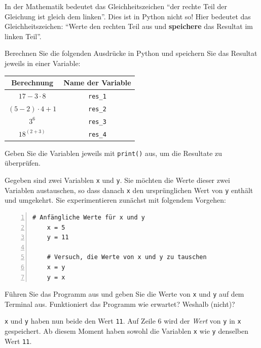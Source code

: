 \begin{myattention}
	In der Mathematik bedeutet das Gleichheitszeichen \enquote{der rechte Teil der Gleichung ist gleich dem linken}. Dies ist in Python nicht so! Hier bedeutet das Gleichheitszeichen: \enquote{Werte den rechten Teil aus und \textbf{speichere} das Resultat im linken Teil}.
\end{myattention}

\begin{myexercise}\label{ex:arithm-ausdruecke}
	Berechnen Sie die folgenden Ausdrücke in Python und speichern Sie das Resultat jeweils in einer Variable:
	\begin{table}[H]
		\centering
		\begin{tabular}{c|c}
			Berechnung          & Name der Variable \\\midrule\midrule
			$17 - 3 \cdot 8$    & \lstinline|res_1| \\\midrule
			$(5-2) \cdot 4 + 1$ & \lstinline|res_2| \\\midrule
			$3^6$               & \lstinline|res_3| \\\midrule
			$18^{(2+3)}$        & \lstinline|res_4|
		\end{tabular}
	\end{table}
	Geben Sie die Variablen jeweils mit \lstinline|print()| aus, um die Resultate zu überprüfen.
	\begin{myanswer}
		
	\end{myanswer}
\end{myexercise}

\begin{myexercise}\label{ex:austausch}
	Gegeben sind zwei Variablen \lstinline|x| und \lstinline|y|. Sie möchten die Werte dieser zwei Variablen austauschen, so dass danach \lstinline|x| den ursprünglichen Wert von \lstinline|y| enthält und umgekehrt. Sie experimentieren zunächst mit folgendem Vorgehen:
	\begin{lstlisting}[numbers=left]
	# Anfängliche Werte für x und y
	x = 5 
	y = 11

	# Versuch, die Werte von x und y zu tauschen
	x = y
	y = x
\end{lstlisting}
	Führen Sie das Programm aus und geben Sie die Werte von \lstinline|x| und \lstinline|y| auf dem Terminal aus. Funktioniert das Programm wie erwartet? Weshalb (nicht)?
	\begin{myanswer}
		\lstinline|x| und \lstinline|y| haben nun beide den Wert \lstinline|11|. Auf Zeile 6 wird der \emph{Wert} von \lstinline|y| in \lstinline|x| gespeichert. Ab diesem Moment haben sowohl die Variablen \lstinline|x| wie \lstinline|y| denselben Wert \lstinline|11|.
	\end{myanswer}
\end{myexercise}

